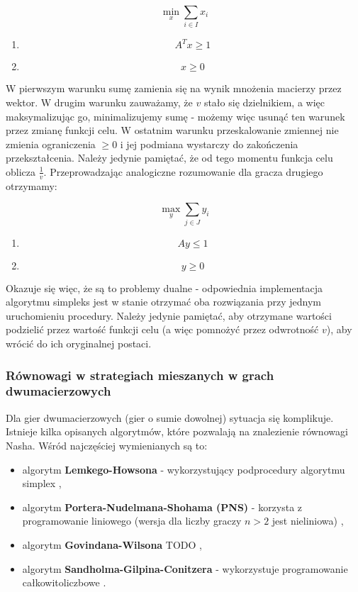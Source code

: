 \documentclass[polish]{standalone}
\begin{document}
$$\min_x \sum_{i \in I} x_i$$
\begin{enumerate}
\item $$A^Tx \geq 1$$
\item $$x \geq 0$$
\end{enumerate}

W pierwszym warunku sumę zamienia się na wynik mnożenia macierzy przez wektor. W drugim warunku zauważamy, że $v$ stało
się dzielnikiem, a więc maksymalizując go, minimalizujemy sumę - możemy więc usunąć ten warunek przez zmianę funkcji
celu. W ostatnim warunku przeskalowanie zmiennej nie zmienia ograniczenia $\geq 0$ i jej podmiana wystarczy do
zakończenia przekształcenia. Należy jedynie pamiętać, że od tego momentu funkcja celu oblicza $\frac{1}{v}$.
Przeprowadzając analogiczne rozumowanie dla gracza drugiego otrzymamy:

$$\max_y \sum_{j \in J} y_i$$
\begin{enumerate}
\item $$Ay \leq 1$$
\item $$y \geq 0$$
\end{enumerate}

Okazuje się więc, że są to problemy dualne - odpowiednia implementacja algorytmu simpleks jest w stanie otrzymać oba
rozwiązania przy jednym uruchomieniu procedury. Należy jedynie pamiętać, aby otrzymane wartości podzielić przez wartość
funkcji celu (a więc pomnożyć przez odwrotność $v$), aby wrócić do ich oryginalnej postaci.

\subsubsection{Równowagi w strategiach mieszanych w grach dwumacierzowych}

Dla gier dwumacierzowych (gier o sumie dowolnej) sytuacja się komplikuje. Istnieje kilka opisanych algorytmów, które
pozwalają na znalezienie równowagi Nasha. Wśród najczęściej wymienianych są to:
\begin{itemize}
\item algorytm \textbf{Lemkego-Howsona} - wykorzystujący podprocedury algorytmu simplex \cite{LH-NE},
\item algorytm \textbf{Portera-Nudelmana-Shohama (PNS)} - korzysta z programowanie liniowego (wersja dla liczby graczy
$n > 2$ jest nieliniowa) \cite{PNS-NE},
\item algorytm \textbf{Govindana-Wilsona} TODO \cite{GR-NE},
\item algorytm \textbf{Sandholma-Gilpina-Conitzera} - wykorzystuje programowanie całkowitoliczbowe \cite{SCG-NE}.
\end{itemize}
\end{document}
